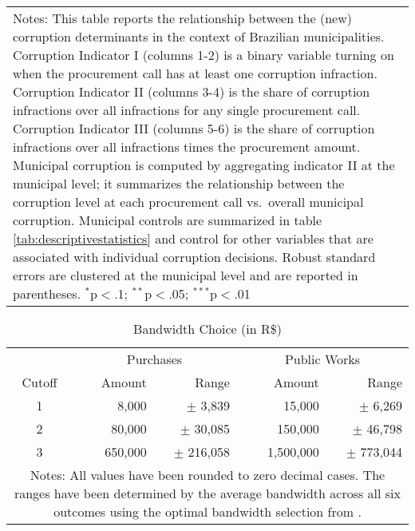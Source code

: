 \documentclass[11pt]{article}
\newcommand\T{\rule{0pt}{2.6ex}}       %
\newcommand\B{\rule[-1.2ex]{0pt}{0pt}} %
\begin{document}
\begin{table}[!htbp]
\begin{tabular}{l@{\extracolsep{4pt}}ccccc@{\extracolsep{4pt}}c}
  \hline
  \multicolumn{7}{p{.93\textwidth}}{\footnotesize{Notes: This table reports the relationship between the (new) corruption determinants in the context of Brazilian municipalities. Corruption Indicator I (columns 1-2) is a binary variable turning on when the procurement call has at least one corruption infraction. Corruption Indicator II (columns 3-4) is the share of corruption infractions over all infractions for any single procurement call. Corruption Indicator III (columns 5-6) is the share of corruption infractions over all infractions times the procurement amount. Municipal corruption is computed by aggregating indicator II at the municipal level; it summarizes the relationship between the corruption level at each procurement call vs.~overall municipal corruption. Municipal controls are summarized in table \ref{tab:descriptivestatistics} and control for other variables that are associated with individual corruption decisions. Robust standard errors are clustered at the municipal level and are reported in parentheses. $^{*}$p$<$.1; $^{**}$p$<$.05; $^{***}$p$<$.01}} \T
  \end{tabular}
\end{table}

\newpage

\begin{table}[!htbp]
\caption{\label{tab:bandwidth}Bandwidth Choice (in R\$)}
\centering
\small
  \begin{tabular}{crr@{\extracolsep{6pt}}rr@{\extracolsep{6pt}}}
    \hline

    \hline
    & \multicolumn{2}{c}{Purchases} & \multicolumn{2}{c}{Public Works} \T \B \\
    \cline{2-3} \cline{4-5}
    Cutoff & Amount  & Range         & Amount    & Range               \T \B \\
    \hline
    1      & 8,000   & $\pm$ 3,839   & 15,000    & $\pm$ 6,269         \T \B \\
    2      & 80,000  & $\pm$ 30,085  & 150,000   & $\pm$ 46,798        \T \B \\
    3      & 650,000 & $\pm$ 216,058 & 1,500,000 & $\pm$ 773,044       \T \B \\
    \hline

    \hline
    \multicolumn{5}{p{.5\textwidth}}{\footnotesize{Notes: All values have been rounded to zero decimal cases. The ranges have been determined by the average bandwidth across all six outcomes using the optimal bandwidth selection from \citet{CalonicoRobustNonparametricConfidence2014, CalonicoOptimalDataDrivenRegression2015, CattaneoInterpretingRegressionDiscontinuity2016}.}}
  \end{tabular}
\end{table}





\setlength\bibsep{0pt}


\end{document}
